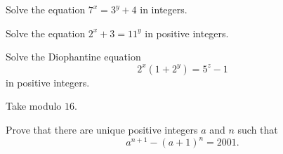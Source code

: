 \documentclass{subfile}
\begin{document}
	\begin{problem} %
		Solve the equation $7^x=3^y+4$ in integers.
	\end{problem}

	\begin{problem} %
		 Solve the equation $2^x+3=11^y$ in positive integers.
	\end{problem}

	\begin{problem} %
		Solve the Diophantine equation $$2^x(1+2^y)=5^z-1$$ in positive integers.
	\end{problem}

	\begin{hint}
		Take modulo $16$.
	\end{hint}
	
	\begin{problem}[Putnam 2001] %
		Prove that there are unique positive integers $a$ and $n$ such that $$a^{n+1}-(a+1)^n=2001.$$
	\end{problem}
\end{document}
